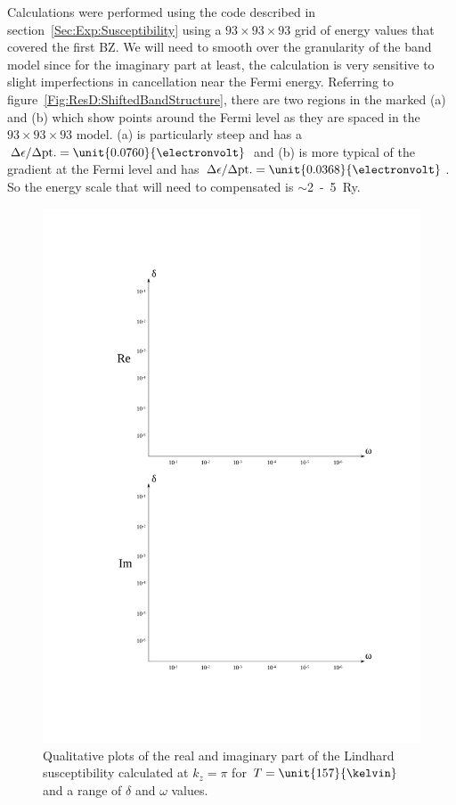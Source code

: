 Calculations were performed using the  code described in section~\ref{Sec:Exp:Susceptibility} using a $93\times93\times93$ grid of energy values that covered the first \ac{BZ}. We will need to smooth over the granularity of the \WIEN band model since for the imaginary part at least, the calculation is very sensitive to slight imperfections in cancellation near the Fermi energy. Referring to figure~\ref{Fig:ResD:ShiftedBandStructure}, there are two regions in the marked (a) and (b) which show points around the Fermi level as they are spaced in the $93\times93\times93$ model. (a) is particularly steep and has a $\Delta \epsilon/\Delta\textrm{pt.} = \unit{0.0760}{\electronvolt}$ and (b) is more typical of the gradient at the Fermi level and has $\Delta \epsilon/\Delta\textrm{pt.} = \unit{0.0368}{\electronvolt}$. So the energy scale that will need to compensated is $\sim$\unit{2-5}{\textrm{\textrm{Ry}}}.

\begin{figure}[htbp]
    \begin{center}
        \includegraphics[scale=0.9]{Chapter-dHvABaFe2P2/Figures/Susceptibility/RangeDeltaOmega/RangeDeltaOmega}
        \caption{Qualitative plots of the real and imaginary part of the Lindhard susceptibility calculated at $k_z=\pi$ for $T=\unit{157}{\kelvin}$ and a range of $\delta$ and $\omega$ values.}
        \label{Fig:ResD:RangeDeltaOmega}
    \end{center}
\end{figure}

